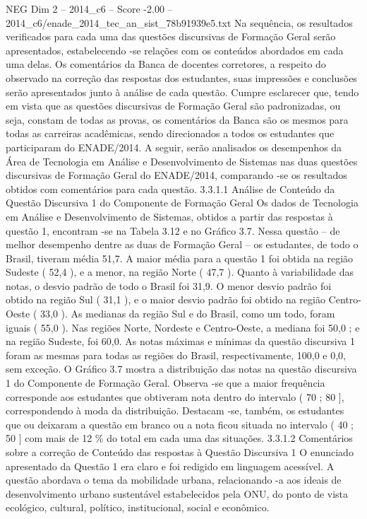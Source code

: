 \begin{textsample}{NEG Dim 2 – 2014\_c6 – Score -2.00 – 2014\_c6/enade\_2014\_tec\_an\_sist\_78b91939e5.txt}
Na sequência, os resultados verificados para cada uma das questões discursivas de Formação Geral serão apresentados, estabelecendo -se relações com os conteúdos abordados em cada uma delas.
Os comentários da Banca de docentes corretores, a respeito do observado na correção das respostas dos estudantes, suas impressões e conclusões serão apresentados junto à análise de cada questão.
Cumpre esclarecer que, tendo em vista que as questões discursivas de Formação Geral são padronizadas, ou seja, constam de todas as provas, os comentários da Banca são os mesmos para todas as carreiras acadêmicas, sendo direcionados a todos os estudantes que participaram do ENADE/2014.
A seguir, serão analisados os desempenhos da Área de Tecnologia em Análise e Desenvolvimento de Sistemas nas duas questões discursivas de Formação Geral do ENADE/2014, comparando -se os resultados obtidos com comentários para cada questão. 3.3.1.1 Análise de Conteúdo da Questão Discursiva 1 do Componente de Formação Geral Os dados de Tecnologia em Análise e Desenvolvimento de Sistemas, obtidos a partir das respostas à questão 1, encontram -se na Tabela 3.12 e no Gráfico 3.7.
Nessa questão – de melhor desempenho dentre as duas de Formação Geral – os estudantes, de todo o Brasil, tiveram média 51,7.
A maior média para a questão 1 foi obtida na região Sudeste ( 52,4 ), e a menor, na região Norte ( 47,7 ).
Quanto à variabilidade das notas, o desvio padrão de todo o Brasil foi 31,9.
O menor desvio padrão foi obtido na região Sul ( 31,1 ), e o maior desvio padrão foi obtido na região Centro-Oeste ( 33,0 ).
As medianas da região Sul e do Brasil, como um todo, foram iguais ( 55,0 ).
Nas regiões Norte, Nordeste e Centro-Oeste, a mediana foi 50,0 ; e na região Sudeste, foi 60,0.
As notas máximas e mínimas da questão discursiva 1 foram as mesmas para todas as regiões do Brasil, respectivamente, 100,0 e 0,0, sem exceção.
O Gráfico 3.7 mostra a distribuição das notas na questão discursiva 1 do Componente de Formação Geral.
Observa -se que a maior frequência corresponde aos estudantes que obtiveram nota dentro do intervalo ( 70 ; 80 ], correspondendo à moda da distribuição.
Destacam -se, também, os estudantes que ou deixaram a questão em branco ou a nota ficou situada no intervalo ( 40 ; 50 ] com mais de 12 \% do total em cada uma das situações. 3.3.1.2 Comentários sobre a correção de Conteúdo das respostas à Questão Discursiva 1 O enunciado apresentado da Questão 1 era claro e foi redigido em linguagem acessível.
A questão abordava o tema da mobilidade urbana, relacionando -a aos ideais de desenvolvimento urbano sustentável estabelecidos pela ONU, do ponto de vista ecológico, cultural, político, institucional, social e econômico.

\end{textsample}
